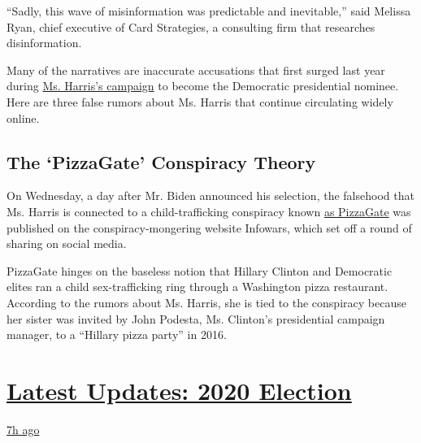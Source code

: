 ``Sadly, this wave of misinformation was predictable and inevitable,''
said Melissa Ryan, chief executive of Card Strategies, a consulting firm
that researches disinformation.

Many of the narratives are inaccurate accusations that first surged last
year during
\href{https://www.nytimes3xbfgragh.onion/2019/12/03/us/politics/kamala-harris-campaign-drops-out.html}{Ms.
Harris's campaign} to become the Democratic presidential nominee. Here
are three false rumors about Ms. Harris that continue circulating widely
online.

\hypertarget{the-pizzagate-conspiracy-theory}{%
\subsection{The `PizzaGate' Conspiracy
Theory}\label{the-pizzagate-conspiracy-theory}}

On Wednesday, a day after Mr. Biden announced his selection, the
falsehood that Ms. Harris is connected to a child-trafficking conspiracy
known
\href{https://www.nytimes3xbfgragh.onion/search?query=Pizzagatehttps://www.nytimes3xbfgragh.onion/2020/06/27/technology/pizzagate-justin-bieber-qanon-tiktok.html}{as
PizzaGate} was published on the conspiracy-mongering website Infowars,
which set off a round of sharing on social media.

PizzaGate hinges on the baseless notion that Hillary Clinton and
Democratic elites ran a child sex-trafficking ring through a Washington
pizza restaurant. According to the rumors about Ms. Harris, she is tied
to the conspiracy because her sister was invited by John Podesta, Ms.
Clinton's presidential campaign manager, to a ``Hillary pizza party'' in
2016.

\hypertarget{latest-updates-2020-election}{%
\section{\texorpdfstring{\href{https://www.nytimes3xbfgragh.onion/live/2020/08/19/us/dnc-convention-election?action=click\&pgtype=Article\&state=default\&region=MAIN_CONTENT_1\&context=storylines_live_updates}{Latest
Updates: 2020
Election}}{Latest Updates: 2020 Election}}\label{latest-updates-2020-election}}

\href{https://www.nytimes3xbfgragh.onion/live/2020/08/19/us/dnc-convention-election?action=click\&pgtype=Article\&state=default\&region=MAIN_CONTENT_1\&context=storylines_live_updates\#night-3-featured-more-policy-a-focus-on-women-and-a-full-throated-rejection-of-trump-by-his-predecessor}{7h
ago}

